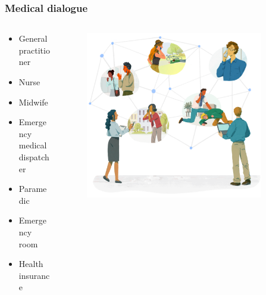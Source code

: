 \begin{frame}[t]
    \frametitle{Medical dialogue}
    \begin{columns}[t]
        \begin{column}{0.4\textwidth}
            \begin{itemize}
                \item <2> General practitioner
                \item <2> Nurse
                \item <2> Midwife
                \item <2> Emergency medical dispatcher
                \item <2> Paramedic
                \item <2> Emergency room
                \item <2> Health insurance
            \end{itemize}
        \end{column}
        \begin{column}{0.6\textwidth}
            \begin{figure}
                \centering
                \includegraphics[width=0.9\textwidth]{figures/corti_sketch_conversations.png}
            \end{figure}
        \end{column}
    \end{columns}
\end{frame}


